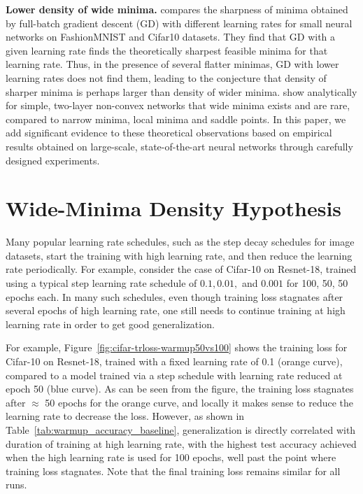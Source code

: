 \documentclass[twoside,11pt]{article}
\begin{document}
\noindent
{\bf Lower density of wide minima.} \citet{wu2018sgd} compares the sharpness of minima obtained by full-batch gradient descent (GD) with different learning rates for small neural networks on FashionMNIST and Cifar10 datasets. They find that GD with a given learning rate finds the theoretically sharpest feasible minima for that learning rate. Thus, in the presence of several flatter minimas, GD with lower learning rates does not find them, leading to the conjecture that density of sharper minima is perhaps larger than density of wider minima. \citet{baldassi2020shaping} show analytically for simple, two-layer non-convex networks that wide minima exists and are rare, compared to narrow minima, local minima and saddle points. In this paper, we add significant evidence to these theoretical observations based on empirical results obtained on large-scale, state-of-the-art neural networks through carefully designed experiments. \section{Wide-Minima Density Hypothesis}
\label{sec:wide_minima_hypothesis}

Many popular learning rate schedules, such as the step decay schedules for image datasets, start the training with high learning rate, and then reduce the learning rate periodically. For example, consider the case of Cifar-10 on Resnet-18, trained using a typical step learning rate schedule of $0.1, 0.01,$ and  $0.001$ for 100, 50, 50 epochs each. In many such schedules, even though training loss stagnates after several epochs of high learning rate, one still needs to continue training at high learning rate in order to get good generalization. 

For example, Figure~\ref{fig:cifar-trloss-warmup50vs100} shows the training loss for Cifar-10 on Resnet-18, trained with a fixed learning rate of 0.1 (orange curve), compared to a model trained via a step schedule with learning rate reduced at epoch 50 (blue curve). As can be seen from the figure, the training loss stagnates after $\approx$ 50 epochs for the orange curve, and locally it makes sense to reduce the learning rate to decrease the loss. However, as shown in Table~\ref{tab:warmup_accuracy_baseline}, generalization is directly correlated with duration of training at high learning rate, with the highest test accuracy achieved when the high learning rate is used for 100 epochs, well past the point where training loss stagnates. Note that the final training loss remains similar for all runs.
\end{document}
